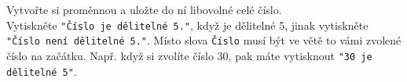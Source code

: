 \question[30]
Vytvořte si proměnnou a uložte do ní libovolné celé číslo.\\
Vytiskněte
\texttt{"Číslo je dělitelné 5."}, když je dělitelné 5, jinak vytiskněte
\texttt{"Číslo není dělitelné 5."}. Místo slova \texttt{Číslo} musí být ve větě
to
vámi zvolené číslo na začátku. Např. když si zvolíte číslo 30, pak máte
vytisknout \texttt{"30 je dělitelné 5"}.